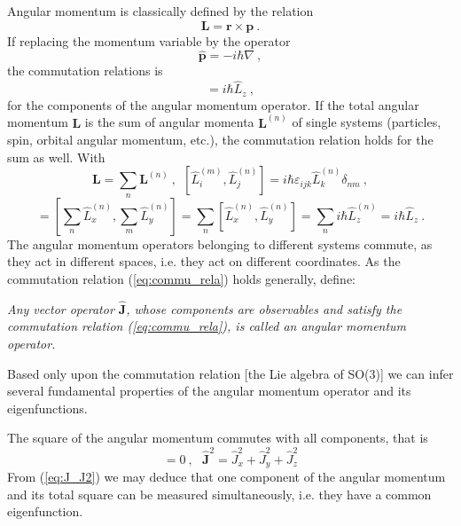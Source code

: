\documentclass[12pt,a4paper]{article}
\renewcommand{\vec}[1]{\boldsymbol{#1}}
\begin{document}
Angular momentum is classically defined by the relation
\begin{equation}
\vec{L} = \vec{r} \times \vec{p} ~.
\end{equation}
If replacing the momentum variable by the operator
\begin{equation}
\hat{\vec{p}} = -i\hbar \nabla ~,
\end{equation}
the commutation relations is
\begin{equation}
[ \hat{L}_x,  \hat{L}_y] = i\hbar \hat{L}_z ~,
\label{eq:commu_rela}
\end{equation}
for the components of the angular momentum operator. If the total angular momentum $\vec{L}$ is the sum of angular momenta $\vec{L}^{(n)}$ of single systems (particles, spin, orbital angular momentum, etc.), the commutation relation holds for the sum as well. With
\begin{equation}
\vec{L} = \sum_n \vec{L}^{(n)} ~, ~~ [ \hat{L}_i^{(m)},  \hat{L}_j^{(n)}] = i\hbar \varepsilon_{ijk} \hat{L}_k^{(n)} \delta_{nm} ~,
\end{equation}
\begin{equation}
[ \hat{L}_x,  \hat{L}_y] = \left[\sum_n \hat{L}_x^{(n)}, \sum_m \hat{L}_y^{(n)} \right] = \sum_n [\hat{L}_x^{(n)}, \hat{L}_y^{(n)} ] = \sum_n i\hbar \hat{L}_z^{(n)} = i\hbar \hat{L}_z ~.
\end{equation}
The angular momentum operators belonging to different systems commute, as they act in different spaces, i.e. they act on
different coordinates. As the commutation relation (\ref{eq:commu_rela}) holds generally, define:

\textit{Any vector operator $\vec{\hat{J}}$, whose components are observables and satisfy the commutation relation (\ref{eq:commu_rela}), is called an angular momentum operator.}

Based only upon the commutation relation [the Lie algebra of SO(3)] we can infer several fundamental properties of the angular momentum operator and its eigenfunctions.

The square of the angular momentum commutes with all components, that is
\begin{equation}
[\vec{\hat{J}}, \vec{\hat{J}}^2] = 0 ~, ~~~  \vec{\hat{J}}^2 =  \hat{J}^2_x + \hat{J}^2_y +\hat{J}^2_z
\label{eq:J_J2}
\end{equation}
From (\ref{eq:J_J2}) we may deduce that one component of the angular momentum and its total square can be measured simultaneously, i.e. they have a common eigenfunction.
\end{document}
